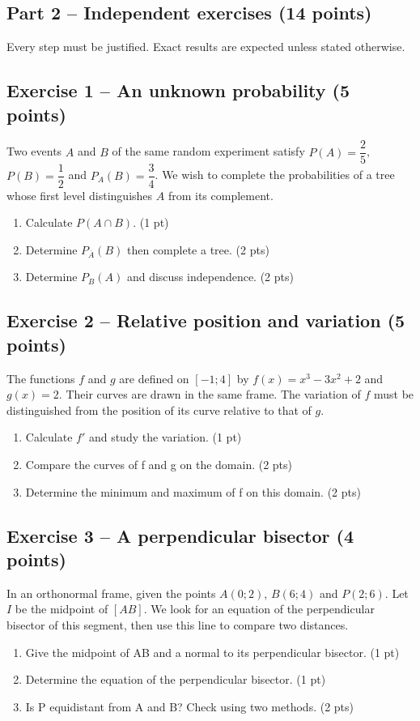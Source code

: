 \clearpage\subsection*{Part 2 -- Independent exercises (14 points)}
Every step must be justified. Exact results are expected unless stated otherwise.
\subsection*{Exercise 1 -- An unknown probability (5 points)}
Two events $A$ and $B$ of the same random experiment satisfy $P(A)=\dfrac25$, $P(B)=\dfrac12$ and $P_A(B)=\dfrac34$. We wish to complete the probabilities of a tree whose first level distinguishes $A$ from its complement.
\begin{enumerate}
\item Calculate $P(A\cap B)$. \hfill(1 pt)
\item Determine $P_{\overline A}(B)$ then complete a tree. \hfill(2 pts)
\item Determine $P_B(A)$ and discuss independence. \hfill(2 pts)
\end{enumerate}
\subsection*{Exercise 2 -- Relative position and variation (5 points)}
The functions $f$ and $g$ are defined on $[-1;4]$ by $f(x)=x^3-3x^2+2$ and $g(x)=2$. Their curves are drawn in the same frame. The variation of $f$ must be distinguished from the position of its curve relative to that of $g$.
\begin{enumerate}
\item Calculate $f\prime$ and study the variation. \hfill(1 pt)
\item Compare the curves of f and g on the domain. \hfill(2 pts)
\item Determine the minimum and maximum of f on this domain. \hfill(2 pts)
\end{enumerate}
\subsection*{Exercise 3 -- A perpendicular bisector (4 points)}
In an orthonormal frame, given the points $A(0;2)$, $B(6;4)$ and $P(2;6)$. Let $I$ be the midpoint of $[AB]$. We look for an equation of the perpendicular bisector of this segment, then use this line to compare two distances.
\begin{enumerate}
\item Give the midpoint of AB and a normal to its perpendicular bisector. \hfill(1 pt)
\item Determine the equation of the perpendicular bisector. \hfill(1 pt)
\item Is P equidistant from A and B? Check using two methods. \hfill(2 pts)
\end{enumerate}
